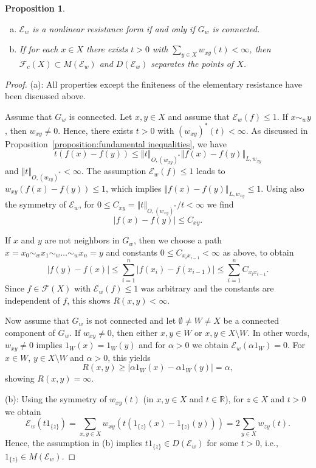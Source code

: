 \documentclass[a4paper,11pt,reqno]{amsart}
\newtheorem{proposition}[lemma]{Proposition}
\theoremstyle{definition}
\numberwithin{equation}{section}
\newcommand{\cE}{{\mathcal E}}
\newcommand{\cF}{{\mathcal F}}
\newcommand{\R}{{\mathbb R}}
\newcommand{\av}[1]{\left\Vert #1\right\Vert}
\newcommand{\1}{\mathds{1}}
\begin{document}
\begin{proposition}\label{proposition:finiteness of resistance graph forms}
 \begin{enumerate}[(a)]
  \item   $\cE_w$ is a nonlinear resistance form if and only if $G_w$ is connected.  
  \item If for each $x \in X$ there exists $t > 0$ with $\sum_{y \in X} w_{xy}(t) < \infty$, then  $\cF_c(X) \subset M(\cE_w)$ and $D(\cE_w)$ separates the points of $X$. 
 \end{enumerate}
\end{proposition}
\begin{proof}
 (a): All properties except the finiteness of the elementary resistance have been discussed above. 
 
 
 Assume that $G_w$ is connected. Let $x,y \in X$ and assume that $\cE_w(f) \leq 1$. If $x \sim_w y$, then $w_{xy} \neq 0$. Hence, there exists $t > 0$ with $(w_{xy})^*(t) < \infty$. As discussed in Proposition~\ref{proposition:fundamental inequalities}, we have 
 $$t (f(x) - f(y)) \leq \av{t}_{O,(w_{xy})^*}\av{f(x) - f(y)}_{L,w_{xy}}$$
and  $\av{t}_{O,(w_{xy})^*} < \infty$. The assumption $\cE_w(f) \leq 1$ leads to $w_{xy}(f(x) - f(y)) \leq 1$, which implies $\av{f(x) - f(y)}_{L,w_{xy}} \leq 1$. Using also the symmetry of $\cE_w$, for $0 \leq C_{xy} = \av{t}_{O,(w_{xy})^*}/t < \infty$ we find
%
$$|f(x) - f(y)| \leq C_{xy}.$$
%
 
If $x$ and $y$ are not neighbors in $G_w$, then we choose a path $x = x_0 \sim_w x_1 \sim_w \ldots \sim_w x_n = y$ and  constants $0 \leq C_{x_ix_{i-1}} < \infty$ as above, to obtain 
%
$$|f(y) - f(x)| \leq \sum_{i = 1}^n |f(x_i) - f(x_{i-1})| \leq \sum_{i = 1}^n C_{x_ix_{i-1}}. $$
%
Since $f \in \cF(X)$ with $\cE_w(f) \leq 1$ was arbitrary and the constants are independent of $f$, this shows $R(x,y)  < \infty$. 

Now assume that $G_w$ is not connected and let $\emptyset \neq W \neq X$ be a connected component of $G_w$. If $w_{xy} \neq 0$, then either $x,y \in W$ or $x,y \in X \setminus W$. In other words, $w_{xy} \neq 0$ implies $1_W(x) = 1_W(y)$ and for   $\alpha > 0$ we obtain $\cE_w( \alpha 1_W) = 0$. For $x \in W$, $y \in X \setminus W$ and $\alpha > 0$, this yields
%
%
$$R(x,y) \geq |\alpha 1_W(x) - \alpha 1_W(y)| = \alpha, $$
%
showing $R(x,y) = \infty$. 

(b): Using the symmetry of $w_{xy}(t)$ (in $x,y \in X$ and $t \in \R$), for $z \in X$ and $t > 0$ we obtain
%
$$\cE_w(t 1_{\{z\}}) = \sum_{x,y \in X} w_{xy}(t(1_{\{z\}}(x) - 1_{\{z\}}(y))) =  2 \sum_{y \in X} w_{zy}(t).$$
%
Hence, the assumption in (b) implies $t 1_{\{z\}} \in D(\cE_w)$ for some $t > 0$, i.e., $1_{\{z\}} \in M(\cE_w)$.
%
\end{proof}
\end{document}
